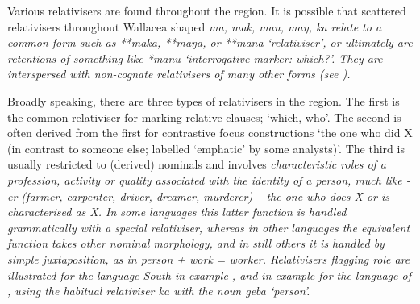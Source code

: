 Various relativisers are found throughout the region.
It is possible that scattered relativisers throughout Wallacea
shaped \it{ma, mak, man, maŋ, ka} relate to a common form such as **maka,
**maŋa, or **mana ‘relativiser’, or ultimately are retentions
of something like  *manu ‘interrogative marker: which?’.
They are interspersed with non-cognate relativisers of many other forms (see ).

Broadly speaking, there are three types of relativisers in the region.
The first is the common relativiser for marking relative clauses; ‘which, who’.
The second is often derived from the first for contrastive focus
constructions ‘the one who did X (in contrast to someone else;
labelled ‘emphatic’ by some analysts)’.
The third is usually restricted to (derived) nominals
and involves \it{characteristic roles} of a profession,
activity or quality associated with the identity of a person,
much like  \it{-er} (\it{farmer,
carpenter, driver, dreamer, murderer}) -- the one who does X or
is characterised as X.
In some languages this latter function is handled grammatically
with a special relativiser,
whereas in other languages the equivalent function takes other
nominal morphology, and in still others it is handled by simple juxtaposition,
as in \it{person + work = worker}.
Relativisers flagging role are illustrated for the 
language South  \citep[61--63,
77f, 164--170]{Bolton1990} in example ,
and in example 
for the  language of  \citep[183, 429--436]{Grimes1991c},
using the habitual relativiser \it{ka} with the noun \it{geba} ‘person’.


